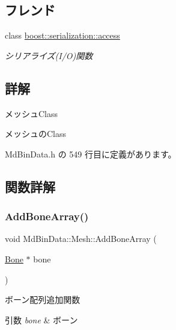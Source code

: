 \subsection*{フレンド}
\begin{DoxyCompactItemize}
\item 
class \mbox{\hyperlink{class_md_bin_data_1_1_mesh_ac98d07dd8f7b70e16ccb9a01abf56b9c}{boost\+::serialization\+::access}}
\begin{DoxyCompactList}\small\item\em シリアライズ(I/O)関数 \end{DoxyCompactList}\end{DoxyCompactItemize}


\subsection{詳解}
メッシュ\+Class 

メッシュの\+Class 

 Md\+Bin\+Data.\+h の 549 行目に定義があります。



\subsection{関数詳解}
\mbox{\label{class_md_bin_data_1_1_mesh_af6c2e5fd653aff7a746c8c913b5175e7}} 
\subsubsection{\texorpdfstring{Add\+Bone\+Array()}{AddBoneArray()}}
{\footnotesize\ttfamily void Md\+Bin\+Data\+::\+Mesh\+::\+Add\+Bone\+Array (\begin{DoxyParamCaption}\item[{\mbox{\hyperlink{class_md_bin_data_1_1_mesh_1_1_bone}{Bone}} $\ast$}]{bone }\end{DoxyParamCaption})}



ボーン配列追加関数 


\begin{DoxyParams}{引数}
{\em bone} & ボーン \\
\hline
\end{DoxyParams}

